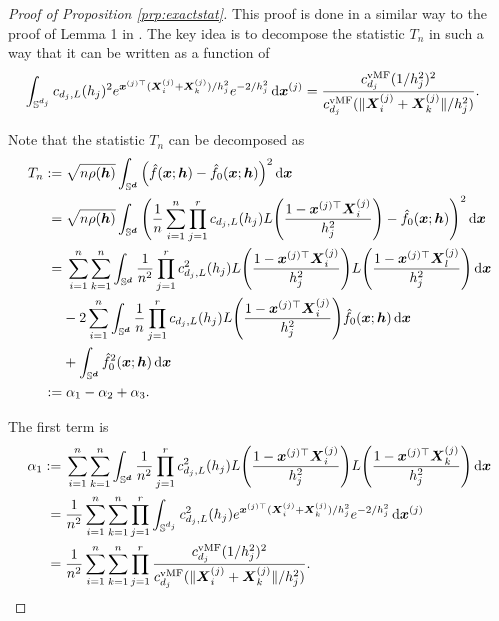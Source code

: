 \documentclass[oneside,11pt]{article}
\begin{document}
\begin{proof}[Proof of Proposition \ref{prp:exactstat}]
    This proof is done in a similar way to the proof of Lemma 1 in \cite{Garcia-Portugues2014}. The key idea is to decompose the statistic $T_n$ in such a way that it can be written as a function of
    \begin{align*}
        \int_{\mathbb{S}^{d_j}} c_{d_j,L}(h_j)^2 e^{\boldsymbol{x}^{(j) \top} (\boldsymbol{X}_i^{(j)} + \boldsymbol{X}_k^{(j)})/h_j^2} e^{-2/h_j^2} \,\mathrm{d} \boldsymbol{x}^{(j)} &= \frac{c_{d_j}^\mathrm{vMF}(1/h_j^2)^2}{c_{d_j}^\mathrm{vMF}(\|\boldsymbol{X}_i^{(j)} + \boldsymbol{X}_k^{(j)}\|/h_j^2)}.
    \end{align*}

Note that the statistic $T_n$ can be decomposed as
\begin{align*}
    T_n := &\; \sqrt{n \rho({\boldsymbol{h}})} \int_{\mathbb{S}^{\boldsymbol{d}}} \Big( \hat{f}(\boldsymbol{x};{\boldsymbol{h}}) - \hat{f}_{0}(\boldsymbol{x};{\boldsymbol{h}}) \Big)^2 \,\mathrm{d} \boldsymbol{x} \\
    =&\; \sqrt{n \rho({\boldsymbol{h}})} \int_{\mathbb{S}^{\boldsymbol{d}}} \Bigg( \frac{1}{n} \sum_{i=1}^{n} \prod_{j=1}^{r} c_{d_j,L}(h_j)L \Bigg( \frac{1 - \boldsymbol{x}^{(j)\top} \boldsymbol{X}_i^{(j)}}{h_j^2} \Bigg) - \hat{f}_{0}(\boldsymbol{x};{\boldsymbol{h}}) \Bigg)^2 \,\mathrm{d} \boldsymbol{x} \\
    =&\; \sum_{i=1}^{n} \sum_{k=1}^{n} \int_{\mathbb{S}^{\boldsymbol{d}}} \frac{1}{n^2} \prod_{j=1}^{r} c^2_{d_j,L}(h_j) L \Bigg( \frac{1 - \boldsymbol{x}^{(j)\top} \boldsymbol{X}_i^{(j)}}{h_j^2} \Bigg) L \Bigg( \frac{1 - \boldsymbol{x}^{(j)\top} \boldsymbol{X}_l^{(j)}}{h_j^2} \Bigg) \,\mathrm{d} \boldsymbol{x} \\
    &- 2 \sum_{i=1}^{n} \int_{\mathbb{S}^{\boldsymbol{d}}} \frac{1}{n} \prod_{j=1}^{r} c_{d_j,L}(h_j)L \Bigg( \frac{1 - \boldsymbol{x}^{(j)\top} \boldsymbol{X}_i^{(j)}}{h_j^2} \Bigg) \hat{f}_{0}(\boldsymbol{x};{\boldsymbol{h}}) \,\mathrm{d} \boldsymbol{x} \\
    &+ \int_{\mathbb{S}^{\boldsymbol{d}}} \hat{f}_{0}^2(\boldsymbol{x};{\boldsymbol{h}}) \,\mathrm{d} \boldsymbol{x} \\
    := &\; \alpha_1 - \alpha_2 + \alpha_3.
\end{align*}

The first term is
\begin{align*}
    \alpha_1 := &\; \sum_{i=1}^{n} \sum_{k=1}^{n} \int_{\mathbb{S}^{\boldsymbol{d}}} \frac{1}{n^2} \prod_{j=1}^{r} c^2_{d_j,L}(h_j) L \Bigg( \frac{1 - \boldsymbol{x}^{(j)\top} \boldsymbol{X}_i^{(j)}}{h_j^2} \Bigg) L \Bigg( \frac{1 - \boldsymbol{x}^{(j)\top} \boldsymbol{X}_k^{(j)}}{h_j^2} \Bigg) \,\mathrm{d} \boldsymbol{x} \\
    =&\; \frac{1}{n^2} \sum_{i=1}^{n} \sum_{k=1}^{n} \prod_{j=1}^{r} \int_{\mathbb{S}^{d_j}} c^2_{d_j,L}(h_j) e^{\boldsymbol{x}^{(j) \top} (\boldsymbol{X}_i^{(j)} + \boldsymbol{X}_k^{(j)})/h_j^2} e^{-2/h_j^2} \,\mathrm{d} \boldsymbol{x}^{(j)} \\
    =&\; \frac{1}{n^2} \sum_{i=1}^{n} \sum_{k=1}^{n} \prod_{j=1}^{r} \frac{c_{d_j}^\mathrm{vMF}(1/h_j^2)^2}{c_{d_j}^\mathrm{vMF}(\|\boldsymbol{X}_i^{(j)} + \boldsymbol{X}_k^{(j)}\|/h_j^2)}.
\end{align*}


\end{proof}
\end{document}
